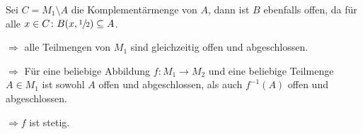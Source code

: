 \documentclass{scrreprt}
\begin{document}
\begin{enumerate}[(i)]
  Sei $C = M_1 \setminus A$ die Komplementärmenge von $A$, dann ist $B$
  ebenfalls offen, da für alle
  $x \in C \colon B\qty(x, \sfrac{1}{2}) \subseteq A$.

  $\Rightarrow$ alle Teilmengen von $M_1$ sind gleichzeitig offen und
  abgeschlossen.

  $\Rightarrow$ Für eine beliebige Abbildung $f \colon M_1 \to M_2$
  und eine beliebige Teilmenge $A \in M_1$ ist sowohl $A$ offen und
  abgeschlossen, als auch $f^{-1}(A)$ offen und abgeschlossen.

  $\Rightarrow f$ ist stetig.

\end{enumerate}
\end{document}
